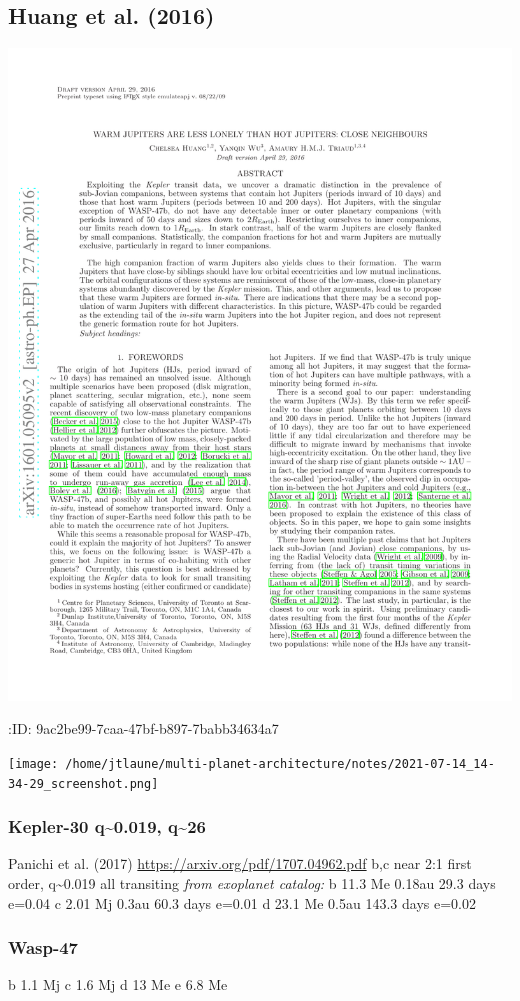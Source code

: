 \documentclass[11pt]{article}
\begin{document}
\subsection{Huang et al. (2016)}
\label{sec:org92cd25b}
\begin{center}
\includegraphics[width=.9\linewidth]{papers/huang-2016-WJneighbors.pdf}
\end{center}
:ID:       9ac2be99-7caa-47bf-b897-7babb34634a7
\begin{center}
\texttt{[image: /home/jtlaune/multi-planet-architecture/notes/2021-07-14\_14-34-29\_screenshot.png]}
\end{center}
\subsubsection{Kepler-30 q\textasciitilde{}0.019, q\textasciitilde{}26}
\label{sec:org8a50bc3}
Panichi et al. (2017)
\url{https://arxiv.org/pdf/1707.04962.pdf}
b,c near 2:1 first order, q\textasciitilde{}0.019
all transiting
\emph{from exoplanet catalog:}
b 11.3 Me 0.18au 29.3 days e=0.04
c 2.01 Mj 0.3au 60.3 days e=0.01
d 23.1 Me 0.5au 143.3 days e=0.02
\subsubsection{Wasp-47}
\label{sec:orga4b09f8}
b 1.1 Mj
c 1.6 Mj
d 13 Me
e 6.8 Me
\end{document}
